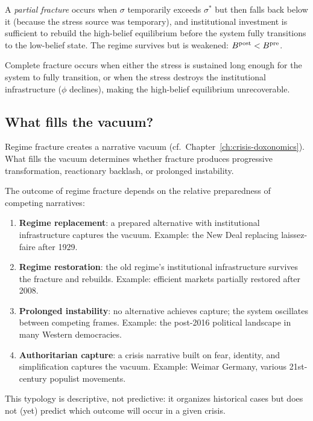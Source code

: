 \begin{definition}
\label{def:partial-fracture}
A \emph{partial fracture} occurs when $\sigma$ temporarily exceeds $\sigma^*$ but then falls back below it (because the stress source was temporary), and institutional investment is sufficient to rebuild the high-belief equilibrium before the system fully transitions to the low-belief state.
The regime survives but is weakened: $B_{}^{\text{post}} < B_{}^{\text{pre}}$.
\end{definition}

Complete fracture occurs when either the stress is sustained long enough for the system to fully transition, or when the stress destroys the institutional infrastructure ($\phi$ declines), making the high-belief equilibrium unrecoverable.

\subsection{What fills the vacuum?}

Regime fracture creates a narrative vacuum (cf.\ Chapter~\ref{ch:crisis-doxonomics}).
What fills the vacuum determines whether fracture produces progressive transformation, reactionary backlash, or prolonged instability.

\begin{remark}
\label{prop:post-fracture}
The outcome of regime fracture depends on the relative preparedness of competing narratives:
\begin{enumerate}[nosep]
  \item \textbf{Regime replacement}: a prepared alternative with institutional infrastructure captures the vacuum. Example: the New Deal replacing laissez-faire after 1929.
  \item \textbf{Regime restoration}: the old regime's institutional infrastructure survives the fracture and rebuilds. Example: efficient markets partially restored after 2008.
  \item \textbf{Prolonged instability}: no alternative achieves capture; the system oscillates between competing frames. Example: the post-2016 political landscape in many Western democracies.
  \item \textbf{Authoritarian capture}: a crisis narrative built on fear, identity, and simplification captures the vacuum. Example: Weimar Germany, various 21st-century populist movements.
\end{enumerate}
This typology is descriptive, not predictive: it organizes historical cases but does not (yet) predict which outcome will occur in a given crisis.
\end{remark}

